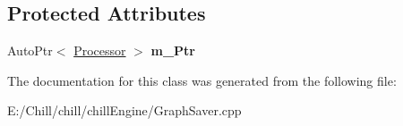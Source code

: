\subsection*{Protected Attributes}
\begin{DoxyCompactItemize}
\item 
\mbox{\label{class_chill_1_1_lua___processor_abf08495ac1b4985911683b3bfd1ef15a}} 
Auto\+Ptr$<$ \mbox{\hyperlink{class_chill_1_1_processor}{Processor}} $>$ {\bfseries m\+\_\+\+Ptr}
\end{DoxyCompactItemize}


The documentation for this class was generated from the following file\+:\begin{DoxyCompactItemize}
\item 
E\+:/\+Chill/chill/chill\+Engine/Graph\+Saver.\+cpp\end{DoxyCompactItemize}
